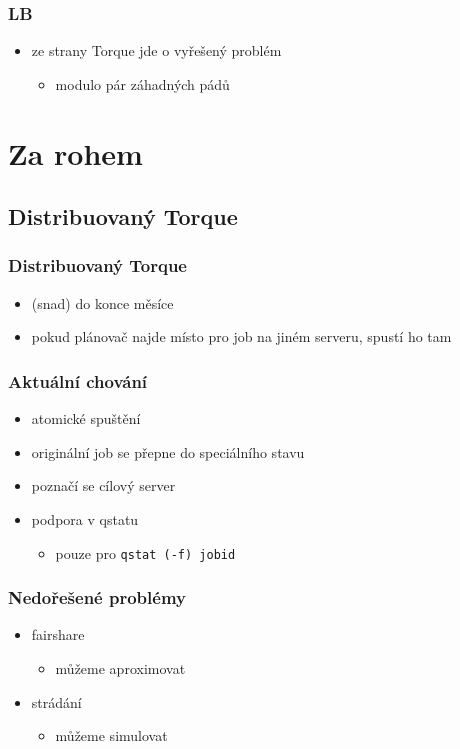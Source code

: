 \documentclass[pdftex,aspectratio=169]{beamer}
\begin{document}
\begin{frame}
	\frametitle{LB}
	\begin{itemize}
		\item{ze strany Torque jde o vyřešený problém}
		\begin{itemize}
			\item{modulo pár záhadných pádů}
		\end{itemize}
	\end{itemize}
\end{frame}

\section{Za rohem}
\subsection{Distribuovaný Torque}

\begin{frame}
	\frametitle{Distribuovaný Torque}
	\begin{itemize}
		\item{(snad) do konce měsíce}
		\item{pokud plánovač najde místo pro job na jiném serveru, spustí ho tam}
	\end{itemize}
\end{frame}

\begin{frame}
	\frametitle{Aktuální chování}
	\begin{itemize}
		\item{atomické spuštění}
		\item{originální job se přepne do speciálního stavu}
		\item{poznačí se cílový server}
		\item{podpora v qstatu}
		\begin{itemize}
			\item{pouze pro \texttt{qstat (-f) jobid}}
		\end{itemize}
	\end{itemize}
\end{frame}

\begin{frame}
	\frametitle{Nedořešené problémy}
	\begin{itemize}
		\item{fairshare}
		\begin{itemize}
			\item{můžeme aproximovat}
		\end{itemize}
		\item{strádání}
		\begin{itemize}
			\item{můžeme simulovat}
		\end{itemize}
	\end{itemize}
\end{frame}
\end{document}
